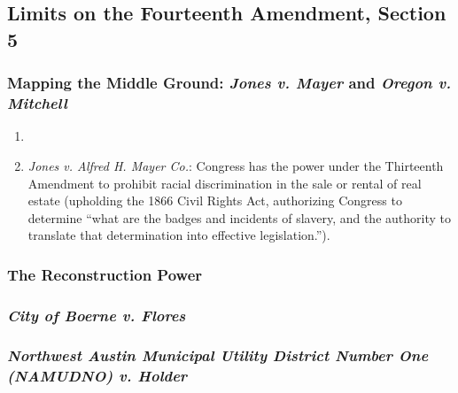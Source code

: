 \subsection{Limits on the Fourteenth Amendment, Section 5}

\subsubsection{Mapping the Middle Ground: \emph{Jones v. Mayer} and 
\emph{Oregon v. Mitchell}}

\begin{enumerate}
    \item %
    \item \emph{Jones v. Alfred H. Mayer Co.}: Congress has the power under 
    the Thirteenth Amendment to prohibit racial discrimination in the sale or 
    rental of real estate (upholding the 1866 Civil Rights Act, authorizing 
    Congress to determine ``what are the badges and incidents of slavery, and 
    the authority to translate that determination into effective 
    legislation.'').
\end{enumerate}
 
\subsubsection{The Reconstruction Power}
 

\subsubsection{\emph{City of Boerne v. Flores}}
 
 
\subsubsection{\emph{Northwest Austin Municipal Utility District Number One 
(NAMUDNO) v. Holder}}

